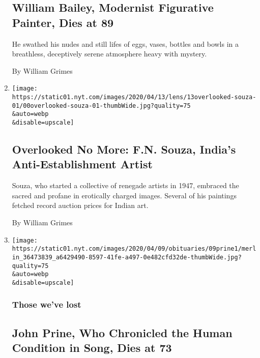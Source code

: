 \begin{enumerate}
{  \subsection{William Bailey, Modernist Figurative Painter, Dies at
  89}\label{william-bailey-modernist-figurative-painter-dies-at-89}}

  He swathed his nudes and still lifes of eggs, vases, bottles and bowls
  in a breathless, deceptively serene atmosphere heavy with mystery.

  By William Grimes
\item
  \href{/2020/04/09/obituaries/fn-souza-overlooked.html}{}

  \texttt{[image: https://static01.nyt.com/images/2020/04/13/lens/13overlooked-souza-01/00overlooked-souza-01-thumbWide.jpg?quality=75\\\&auto=webp\\\&disable=upscale]}

  \hypertarget{overlooked-no-more-fn-souza-indias-anti-establishment-artist}{%
  \subsection{Overlooked No More: F.N. Souza, India's Anti-Establishment
  Artist}\label{overlooked-no-more-fn-souza-indias-anti-establishment-artist}}

  Souza, who started a collective of renegade artists in 1947, embraced
  the sacred and profane in erotically charged images. Several of his
  paintings fetched record auction prices for Indian art.

  By William Grimes
\item
  \href{/2020/04/07/arts/music/john-prine-dead-coronavirus.html}{}

  \texttt{[image: https://static01.nyt.com/images/2020/04/09/obituaries/09prine1/merlin\_36473839\_a6429490-8597-41fe-a497-0e482cfd32de-thumbWide.jpg?quality=75\\\&auto=webp\\\&disable=upscale]}

  \hypertarget{those-weve-lost}{%
  \subsubsection{Those we've lost}\label{those-weve-lost}}

  \hypertarget{john-prine-who-chronicled-the-human-condition-in-song-dies-at-73}{%
  \subsection{John Prine, Who Chronicled the Human Condition in Song,
  Dies at
  73}\label{john-prine-who-chronicled-the-human-condition-in-song-dies-at-73}}


\end{enumerate}

